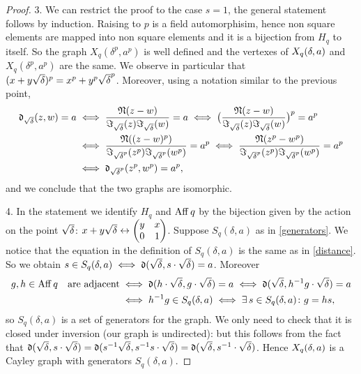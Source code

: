\begin{theorem}
\begin{proof}
3. We can restrict the proof to the case $s=1$, the general statement follows by induction.
Raising to $p$ is a field automorphisim, hence non square elements are mapped into non square elements 
and it is a bijection from $H_q$ to itself. So the graph $X_q (\delta^{p}, a^{p})$ is well defined and the vertexes of 
$X_q (\delta ,a)$ and $X_q (\delta^{p}, a^{p})$ are the same. We observe in particular that $(x+y\sqrt{\delta})^p=x^p+y^p\sqrt{\delta}^p$.
Moreover, using a notation similar to the previous point,
\begin{align*}
	\operatorname{\mathfrak{d}}_{\sqrt{\delta}} (z,w)=a & \iff \frac{\operatorname{\mathfrak{N}} (z-w)}{\Im_{\sqrt{\delta}} (z) \Im_{\sqrt{\delta}} (w)}=a
	 \iff \big(\frac{\operatorname{\mathfrak{N}} (z-w)}{\Im_{\sqrt{\delta}} (z) \Im_{\sqrt{\delta}} (w)}\big)^p = a^p \\
	& \iff \frac{\operatorname{\mathfrak{N}} ((z-w)^p)}{\Im_{\sqrt{\delta}^p} (z^p) \Im_{\sqrt{\delta}^p} (w^p)}=a^p
	 \iff \frac{\operatorname{\mathfrak{N}} (z^p-w^p)}{\Im_{\sqrt{\delta}^p} (z^p) \Im_{\sqrt{\delta}^p} (w^p)}=a^p \\ &\iff \operatorname{\mathfrak{d}}_{\sqrt{\delta}^p} (z^p,w^p)=a^p,
\end{align*}
and we conclude that the two graphs are isomorphic.

4. In the statement we identify $H_q$ and $\operatorname{Aff} q$ by the bijection given by the action on the point $\sqrt{\delta}$:
$x+y\sqrt{\delta} \leftrightarrow \begin{pmatrix} y & x \\ 0 & 1 \end{pmatrix}$.
Suppose $S_q(\delta,a)$ as in \ref{generators}. We notice that the equation in the definition of $S_q(\delta,a)$
is the same as in \ref{distance}. So we obtain $s \in S_q(\delta,a) \iff \operatorname{\mathfrak{d}} (\sqrt{\delta}, s \cdot \sqrt{\delta}) = a$. Moreover
\begin{align*}
	g,h \in \operatorname{Aff} q \quad \text{are adjacent} &\iff \operatorname{\mathfrak{d}} (h \cdot \sqrt{\delta}, g \cdot \sqrt{\delta}) = a \iff \operatorname{\mathfrak{d}} ( \sqrt{\delta}, h^{-1}g \cdot \sqrt{\delta}) = a\\
	&\iff h^{-1}g \in S_q(\delta,a) \iff \exists \, s \in S_q(\delta,a)\colon g=hs,
\end{align*}
so $S_q(\delta,a)$ is a set of generators for the graph. We only need to check that it is closed under inversion (our graph is undirected):
but this follows from the fact that $\operatorname{\mathfrak{d}}(\sqrt{\delta}, s\cdot \sqrt{\delta})=\operatorname{\mathfrak{d}}(s^{-1}\sqrt{\delta}, s^{-1}s\cdot \sqrt{\delta})=\operatorname{\mathfrak{d}}(\sqrt{\delta}, s^{-1}\cdot \sqrt{\delta})$.
Hence $X_q (\delta ,a)$ is a Cayley graph with generators $S_q(\delta,a)$.


\end{proof}
\end{theorem}
